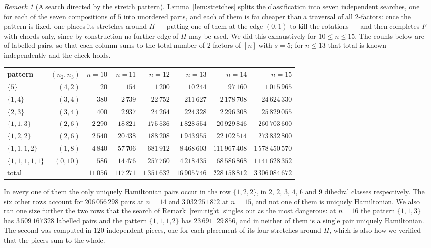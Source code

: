 \documentclass[11pt,a4paper]{article}
\theoremstyle{definition}
\theoremstyle{remark}
\newtheorem{remark}[theorem]{Remark}
\begin{document}
\begin{remark}[A search directed by the stretch pattern]\label{rem:patron}
Lemma~\ref{lem:stretches} splits the classification into seven independent searches, one for each of the seven compositions of $5$ into unordered parts, and each of them is far cheaper than a traversal of all 2-factors: once the pattern is fixed, one places its stretches around $H$ --- putting one of them at the edge $(0,1)$ to kill the rotations --- and then completes $F$ with chords only, since by construction no further edge of $H$ may be used. We did this exhaustively for $10\le n\le15$. The counts below are of labelled pairs, so that each column sums to the total number of 2-factors of $[n]$ with $s=5$; for $n\le13$ that total is known independently and the check holds.
\begin{center}
\small
\setlength{\tabcolsep}{4pt}
\begin{tabular}{lrrrrrrr}
\toprule
pattern & $(n_2,n_3)$ & $n=10$ & $n=11$ & $n=12$ & $n=13$ & $n=14$ & $n=15$\\
\midrule
$\{5\}$          & $(4,2)$  & $20$  & $154$    & $1\,200$   & $10\,244$    & $97\,160$     & $1\,015\,965$ \\
$\{1,4\}$        & $(3,4)$  & $380$ & $2\,739$ & $22\,752$  & $211\,627$   & $2\,178\,708$ & $24\,624\,330$ \\
$\{2,3\}$        & $(3,4)$  & $400$ & $2\,937$ & $24\,264$  & $224\,328$   & $2\,296\,308$ & $25\,829\,055$ \\
$\{1,1,3\}$      & $(2,6)$  & $2\,290$ & $18\,821$ & $175\,536$ & $1\,828\,554$ & $20\,929\,846$ & $260\,703\,600$ \\
$\{1,2,2\}$      & $(2,6)$  & $2\,540$ & $20\,438$ & $188\,208$ & $1\,943\,955$ & $22\,102\,514$ & $273\,832\,800$ \\
$\{1,1,1,2\}$    & $(1,8)$  & $4\,840$ & $57\,706$ & $681\,912$ & $8\,468\,603$ & $111\,967\,408$ & $1\,578\,450\,570$ \\
$\{1,1,1,1,1\}$  & $(0,10)$ & $586$ & $14\,476$ & $257\,760$ & $4\,218\,435$ & $68\,586\,868$ & $1\,141\,628\,352$ \\
\midrule
total            &          & $11\,056$ & $117\,271$ & $1\,351\,632$ & $16\,905\,746$ & $228\,158\,812$ & $3\,306\,084\,672$\\
\bottomrule
\end{tabular}
\end{center}
In every one of them the only uniquely Hamiltonian pairs occur in the row $\{1,2,2\}$, in $2$, $2$, $3$, $4$, $6$ and $9$ dihedral classes respectively. The six other rows account for $206\,056\,298$ pairs at $n=14$ and $3\,032\,251\,872$ at $n=15$, and not one of them is uniquely Hamiltonian. We also ran one size further the two rows that the search of Remark~\ref{rem:tight} singles out as the most dangerous: at $n=16$ the pattern $\{1,1,3\}$ has $3\,509\,167\,328$ labelled pairs and the pattern $\{1,1,1,2\}$ has $23\,691\,129\,856$, and in neither of them is a single pair uniquely Hamiltonian. The second was computed in $120$ independent pieces, one for each placement of its four stretches around $H$, which is also how we verified that the pieces sum to the whole.


\end{remark}
\end{document}
